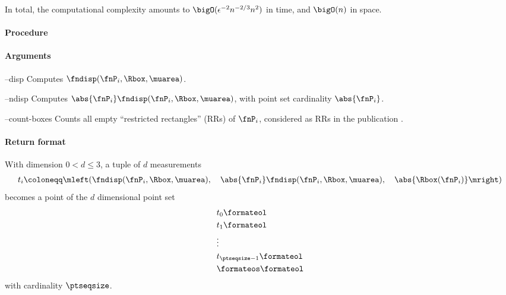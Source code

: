 In total, the computational complexity amounts to $\bigO(\epsilon^{-2} n^{-2/3} n^2)$ in time, and $\bigO(n)$ in space.

\paragraph{Procedure}

\begin{synopsis}
\end{synopsis}

\paragraph{Arguments}

\begin{procarg}{--disp}
  Computes $\fndisp(\fnP_i, \Rbox, \muarea)$.
\end{procarg}

\begin{procarg}{--ndisp}
  Computes $\abs{\fnP_i} \fndisp(\fnP_i, \Rbox, \muarea)$, with point set cardinality $\abs{\fnP_i}$.
\end{procarg}

\begin{procarg}{--count-boxes}
  Counts all empty \enquote{restricted rectangles} (RRs) of $\fnP_i$, considered as RRs in the publication .
\end{procarg}

\procarginseq{\ptseqsize}

\procargout

\procargsilent
\clearpage
\paragraph{Return format}

With dimension $0 < d \leq 3$, a tuple of $d$ measurements
\begin{align*}
  t_i \coloneqq \mleft( \fndisp(\fnP_i, \Rbox, \muarea),\quad \abs{\fnP_i} \fndisp(\fnP_i, \Rbox, \muarea),\quad \abs{\Rbox(\fnP_i)} \mright)
\end{align*}
becomes a point of the $d$ dimensional point set
\begin{align*}
  &t_0\formateol\\
  &t_1\formateol\\
  &\vdots \\
  &t_{\ptseqsize-1}\formateol\\
  &\formateos\formateol
\end{align*}
with cardinality $\ptseqsize$.

